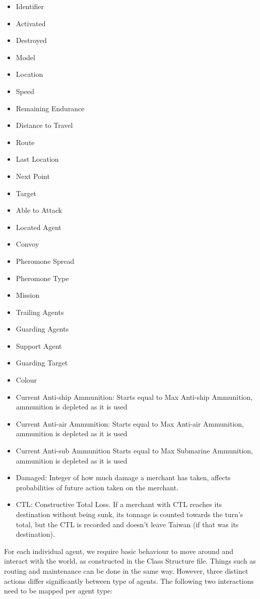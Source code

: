 \documentclass{article}
\begin{document}
\begin{itemize}
    \item Identifier
    \item Activated
    \item Destroyed
    \item Model
    \item Location
    \item Speed
    \item Remaining Endurance
    \item Distance to Travel
    \item Route
    \item Last Location
    \item Next Point
    \item Target
    \item Able to Attack
    \item Located Agent
    \item Convoy
    \item Pheromone Spread
    \item Pheromone Type
    \item Mission
    \item Trailing Agents
    \item Guarding Agents
    \item Support Agent
    \item Guarding Target
    \item Colour
    \item Current Anti-ship Ammunition: Starts equal to Max Anti-ship Ammunition, ammunition is depleted as it is used
    \item Current Anti-air Ammunition: Starts equal to Max Anti-air Ammunition, ammunition is depleted as it is used
    \item Current Anti-sub Ammunition Starts equal to Max Submarine Ammunition, ammunition is depleted as it is used
    \item Damaged: Integer of how much damage a merchant has taken, affects probabilities of future action taken on the merchant.
    \item CTL: Constructive Total Loss. If a merchant with CTL reaches its destination without being sunk, its tonnage is counted towards the turn's total, but the CTL is recorded and doesn't leave Taiwan (if that was its destination).
\end{itemize}


\noindent For each individual agent, we require basic behaviour to move around and interact with the world, as constructed in the Class Structure file. Things such as routing and maintenance can be done in the same way. However, three distinct actions differ significantly between type of agents. The following two interactions need to be mapped per agent type:
\end{document}
